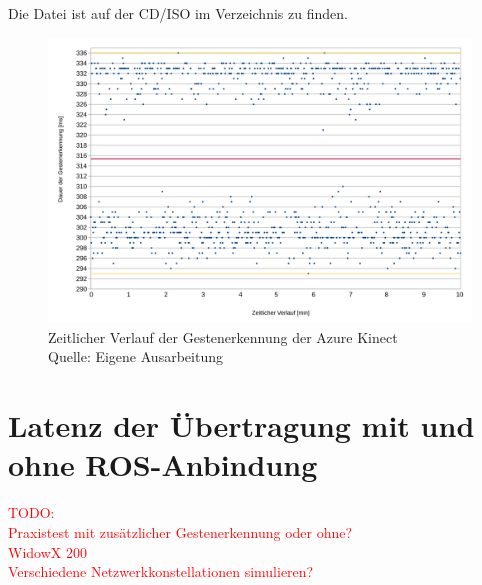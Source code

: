 Die Datei  ist auf der CD/ISO im Verzeichnis  zu finden.

\begin{figure}[htb]
	\centering
	\includegraphics[width=1.0\textwidth]{images/ergebnisse/dauer_der_gestenerkennung_verlauf}
	\caption[Zeitlicher Verlauf der Gestenerkennung der Azure Kinect]{Zeitlicher Verlauf der Gestenerkennung der Azure Kinect\\Quelle: Eigene Ausarbeitung}
	\label{fig:sched_deadline}
\end{figure}
\FloatBarrier


\section{Latenz der Übertragung mit und ohne ROS-Anbindung}
\textcolor{red}{TODO:\\
Praxistest mit zusätzlicher Gestenerkennung oder ohne?\\
WidowX 200\\
Verschiedene Netzwerkkonstellationen simulieren? %
}




